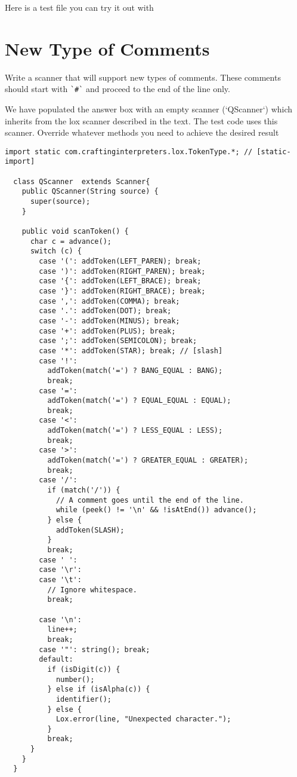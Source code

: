 \documentclass[twoside=false, DIV=14]{scrartcl}
\begin{document}
Here is a test file you can try it out with



\section*{New Type of Comments}
Write a scanner that will support new types of comments.  These comments should start with \lstinline|`#`| and proceed to the end of the line only.

We have populated the answer box with an empty scanner (`QScanner`) which inherits from the lox scanner described in the text.  The test code uses this scanner.  Override whatever methods you need to achieve the desired result

\begin{lstlisting}
import static com.craftinginterpreters.lox.TokenType.*; // [static-import]

  class QScanner  extends Scanner{
    public QScanner(String source) {
      super(source);
    }

    public void scanToken() {
      char c = advance();
      switch (c) {
        case '(': addToken(LEFT_PAREN); break;
        case ')': addToken(RIGHT_PAREN); break;
        case '{': addToken(LEFT_BRACE); break;
        case '}': addToken(RIGHT_BRACE); break;
        case ',': addToken(COMMA); break;
        case '.': addToken(DOT); break;
        case '-': addToken(MINUS); break;
        case '+': addToken(PLUS); break;
        case ';': addToken(SEMICOLON); break;
        case '*': addToken(STAR); break; // [slash]
        case '!':
          addToken(match('=') ? BANG_EQUAL : BANG);
          break;
        case '=':
          addToken(match('=') ? EQUAL_EQUAL : EQUAL);
          break;
        case '<':
          addToken(match('=') ? LESS_EQUAL : LESS);
          break;
        case '>':
          addToken(match('=') ? GREATER_EQUAL : GREATER);
          break;
        case '/':
          if (match('/')) {
            // A comment goes until the end of the line.
            while (peek() != '\n' && !isAtEnd()) advance();
          } else {
            addToken(SLASH);
          }
          break;
        case ' ':
        case '\r':
        case '\t':
          // Ignore whitespace.
          break;

        case '\n':
          line++;
          break;
        case '"': string(); break;
        default:
          if (isDigit(c)) {
            number();
          } else if (isAlpha(c)) {
            identifier();
          } else {
            Lox.error(line, "Unexpected character.");
          }
          break;
      }
    }
  }
\end{lstlisting}  
\end{document}

